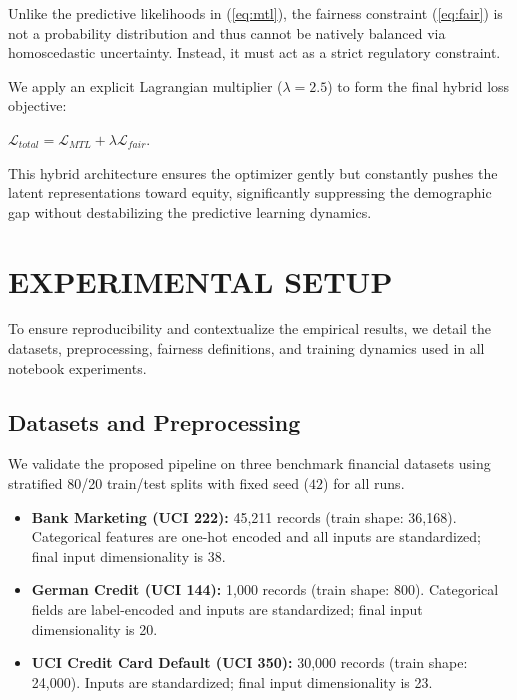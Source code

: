 \documentclass{wscpaperproc}
\theoremstyle{wsc}
\begin{document}
Unlike the predictive likelihoods in (\ref{eq:mtl}), the fairness constraint (\ref{eq:fair}) is not a probability distribution and thus cannot be natively balanced via homoscedastic uncertainty. Instead, it must act as a strict regulatory constraint. 

We apply an explicit Lagrangian multiplier ($\lambda = 2.5$) to form the final hybrid loss objective:

$
    \mathcal{L}_{total} = \mathcal{L}_{MTL} + \lambda \mathcal{L}_{fair}.
$

This hybrid architecture ensures the optimizer gently but constantly pushes the latent representations toward equity, significantly suppressing the demographic gap without destabilizing the predictive learning dynamics.



\section{EXPERIMENTAL SETUP}
\label{sec:experimental_setup}
To ensure reproducibility and contextualize the empirical results, we detail the datasets, preprocessing, fairness definitions, and training dynamics used in all notebook experiments.

\subsection{Datasets and Preprocessing}
We validate the proposed pipeline on three benchmark financial datasets using stratified 80/20 train/test splits with fixed seed ($42$) for all runs.  
\begin{itemize}
    \item \textbf{Bank Marketing (UCI 222):} 45,211 records (train shape: 36,168). Categorical features are one-hot encoded and all inputs are standardized; final input dimensionality is 38.
    \item \textbf{German Credit (UCI 144):} 1,000 records (train shape: 800). Categorical fields are label-encoded and inputs are standardized; final input dimensionality is 20.
    \item \textbf{UCI Credit Card Default (UCI 350):} 30,000 records (train shape: 24,000). Inputs are standardized; final input dimensionality is 23.
\end{itemize}
\end{document}
